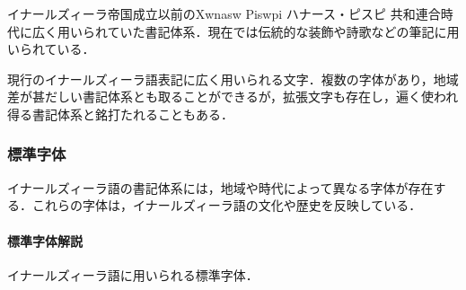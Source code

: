 \documentclass[
  japanese,
]{article}
\providecommand{\tightlist}{%
  \setlength{\itemsep}{0pt}\setlength{\parskip}{0pt}}
\begin{document}
\begin{description}
\tightlist
\item[ピスピ文字]
イナールズィーラ帝国成立以前の{Xwnasw Piswpi} ハナース・ピスピ
共和連合時代に広く用いられていた書記体系．現在では伝統的な装飾や詩歌などの筆記に用いられている．
\item[イナールズィーラ文字]
現行のイナールズィーラ語表記に広く用いられる文字．複数の字体があり，地域差が甚だしい書記体系とも取ることができるが，拡張文字も存在し，遍く使われ得る書記体系と銘打たれることもある．
\end{description}

\subsubsection{標準字体}\label{section3.2}

イナールズィーラ語の書記体系には，地域や時代によって異なる字体が存在する．これらの字体は，イナールズィーラ語の文化や歴史を反映している．

\paragraph{標準字体解説}\label{subsection3.2.1}

イナールズィーラ語に用いられる標準字体．
\end{document}
